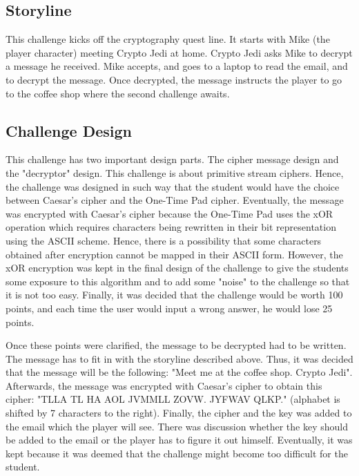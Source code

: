 \documentclass{l4proj}
\begin{document}
\subsection{Storyline}

This challenge kicks off the cryptography quest line. It starts with Mike (the player character) 
meeting Crypto Jedi at home. Crypto Jedi asks Mike to decrypt a message he received. Mike accepts, and goes
to a laptop to read the email, and to decrypt the message. Once decrypted, 
the message instructs the player to go to the coffee shop where the second challenge awaits.

\subsection{Challenge Design}

This challenge has two important design parts. The cipher message design and the "decryptor" design.
This challenge is about primitive stream ciphers. Hence, the challenge was designed in such way that
the student would have the choice between Caesar's cipher and the One-Time Pad cipher. Eventually,
the message was encrypted with Caesar's cipher because the One-Time Pad uses the xOR operation which requires
characters being rewritten in their bit representation using the ASCII scheme. 
Hence, there is a possibility that some characters obtained after encryption cannot be mapped in their ASCII form.
However, the xOR encryption was kept in the final design of the challenge to give the students some exposure
to this algorithm and to add some "noise" to the challenge so that it is not too easy.
Finally, it was decided that the challenge would be worth 100 points, and each time the user would input
a wrong answer, he would lose 25 points.

Once these points were clarified, the message to be decrypted had to be written. 
The message has to fit in with the storyline described above. 
Thus, it was decided that the message will be the following: "Meet me at the coffee shop. Crypto Jedi".
Afterwards, the message was encrypted with Caesar's cipher to obtain this cipher: "TLLA TL HA AOL JVMMLL ZOVW. JYFWAV QLKP."
(alphabet is shifted by 7 characters to the right). 
Finally, the cipher and the key was added to the email which the player will see.
There was discussion whether the key should be added to the email 
or the player has to figure it out himself. 
Eventually, it was kept because it was deemed that the challenge might become too difficult for the student.
\end{document}
